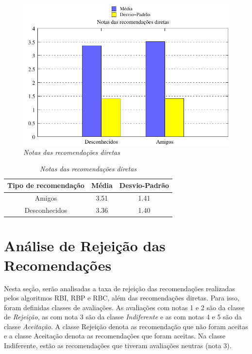 \begin{figure}
    \centering
    \includegraphics[width=\textwidth]{imagens/grafico_notas_medias_diretas}
    \caption{\it Notas das recomendações diretas}
    \label{fig:notas_medias_diretas}
\end{figure}

\begin{table}
\centering
\begin{tabular}{c c c}
    \hline \hline
    \textbf{Tipo de recomendação} & \textbf{Média}& \textbf{Desvio-Padrão} \\
\hline 
Amigos & 3.51 & 1.41 \\
\hline 
Desconhecidos & 3.36 & 1.40 \\
\hline        
\end{tabular}
\caption{\it Notas das recomendações diretas}
\label{table:notas_medias_diretas}
\end{table}


\section{Análise de Rejeição das Recomendações}
\label{sec:analise_de_rejeicao_das_recomendacoes}

 Nesta seção, serão analisadas a taxa de rejeição das recomendações realizadas pelos algoritmos RBI, RBP e RBC, além das recomendações diretas. Para isso, foram definidas classes de avaliações. As avaliações com notas 1 e 2 são da classe de \textit{Rejeição}, as com nota 3 são da classe \textit{Indiferente} e as com notas 4 e 5 são da classe \textit{Aceitação}. A classe Rejeição denota as recomendação que não foram aceitas e a classe Aceitação denota as recomendações que foram aceitas. Na classe Indiferente, estão as recomendações que tiveram avaliações neutras (nota 3).

